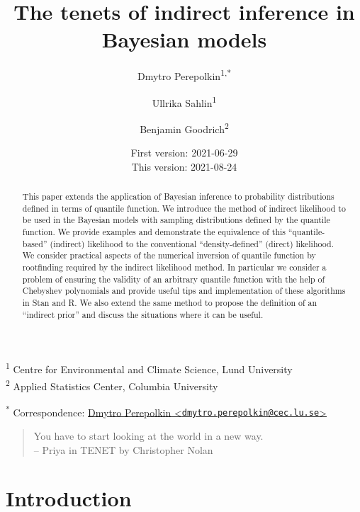 \documentclass[
  12pt,
]{article}
\title{\vspace{1cm}The tenets of indirect inference in Bayesian models\vspace{0.5cm}}
\author{Dmytro Perepolkin\textsuperscript{1,*} \and Ullrika Sahlin\textsuperscript{1} \and Benjamin Goodrich\textsuperscript{2}}
\date{First version: 2021-06-29\\
This version: 2021-08-24}
\begin{document}
\maketitle
\begin{abstract}
\noindent{}
This paper extends the application of Bayesian inference to probability distributions defined in terms of quantile function. We introduce the method of indirect likelihood to be used in the Bayesian models with sampling distributions defined by the quantile function. We provide examples and demonstrate the equivalence of this ``quantile-based'' (indirect) likelihood to the conventional ``density-defined'' (direct) likelihood. We consider practical aspects of the numerical inversion of quantile function by rootfinding required by the indirect likelihood method. In particular we consider a problem of ensuring the validity of an arbitrary quantile function with the help of Chebyshev polynomials and provide useful tips and implementation of these algorithms in Stan and R. We also extend the same method to propose the definition of an ``indirect prior'' and discuss the situations where it can be useful. \vspace{.8cm}
\end{abstract}

\textsuperscript{1} Centre for Environmental and Climate Science, Lund University\\
\textsuperscript{2} Applied Statistics Center, Columbia University

\textsuperscript{*} Correspondence: \href{mailto:dmytro.perepolkin@cec.lu.se}{Dmytro Perepolkin \textless{}\href{mailto:dmytro.perepolkin@cec.lu.se}{\nolinkurl{dmytro.perepolkin@cec.lu.se}}\textgreater{}}

\setcounter{tocdepth}{4}
\tableofcontents
\renewcommand{\[}{\begin{equation}}
\renewcommand{\]}{\end{equation}}

\begin {quotation}
You have to start looking at the world in a new way.\\ 
-- Priya in TENET by Christopher Nolan 
\end{quotation}

\hypertarget{introduction}{%
\section{Introduction}\label{introduction}}
\end{document}
